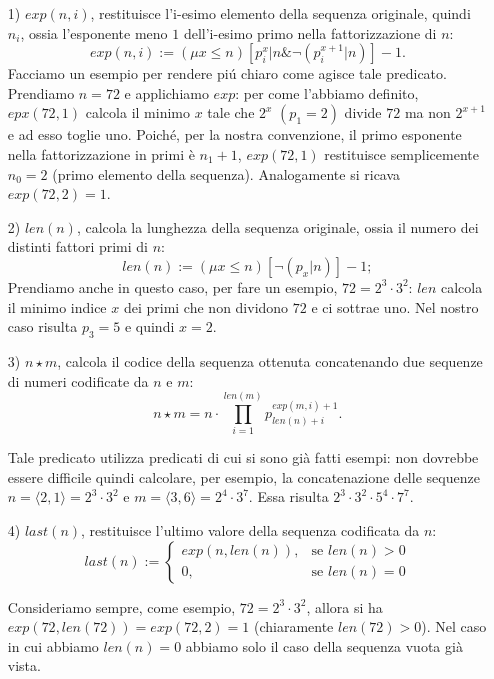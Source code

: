 \begin{itemize}
\item[1)] {$exp(n,i)$, restituisce l'i-esimo elemento della sequenza originale, quindi $n_i$, ossia l'esponente meno $1$ dell'i-esimo primo nella fat\-to\-riz\-za\-zio\-ne di $n$: $$exp(n,i) := (\mu x \leq n){ [p_{i}^{x}|n \& \neg (p_i^{x+1}|n)]-1.}$$
   Facciamo un esempio per rendere pi\'u chiaro come agisce tale predicato. Prendiamo $n=72$ e applichiamo $exp$:
per come l'abbiamo definito, $epx(72,1)$ calcola il minimo $x$ tale che $2^x$ $(p_1=2)$ divide $72$ ma non $2^{x+1}$ e ad esso toglie uno. Poich\'e, per la nostra convenzione, il primo esponente nella fattorizzazione in primi \`e $n_1+1$, $exp(72,1)$ restituisce semplicemente $n_0=2$ (primo elemento della sequenza). Analogamente si ricava $exp(72,2)=1$.}

\item[2)] $len(n)$, calcola la lunghezza della sequenza originale, ossia il numero dei distinti fattori primi di $n$:
    $$len(n):= (\mu x \leq n)[\neg (p_x|n)] - 1;$$
    Prendiamo anche in questo caso, per fare un esempio, $72=2^3\cdot3^2$: $len$ calcola il minimo indice $x$ dei primi che non dividono $72$ e ci sottrae uno. Nel nostro caso risulta $p_3=5$ e quindi $x=2$.

\item[3)] $n\star m$, calcola il codice della sequenza ottenuta concatenando due sequenze di numeri codificate da $n$ e $m$: $$n\star m= n\cdot \prod_{i=1}^{len(m)} p_{len(n)+i}^{exp(m,i)+1}.$$


Tale predicato utilizza predicati di cui si sono gi\`a fatti esempi: non dovrebbe essere difficile quindi calcolare, per esempio, la concatenazione delle sequenze $n=\langle 2, 1\rangle = 2^3\cdot 3^2 $ e $m=\langle 3, 6\rangle = 2^4\cdot 3^7$. Essa risulta $2^3\cdot 3^2\cdot 5^4 \cdot 7^7$.

\item[4)] $last(n)$, restituisce l'ultimo valore della sequenza codificata da $n$:
$$last(n) := \left\{
\begin{array}{ll}
exp(n,len(n)), & \textrm{se $len(n)> 0$} \\
0, & \textrm{se $len(n)= 0$}
\end{array}
\right.$$

Consideriamo sempre, come esempio, $72=2^3\cdot 3^2$, allora si ha $exp(72, len(72)) = exp(72,2) = 1$ (chiaramente $len(72)>0$).
Nel caso in cui abbiamo $len(n)=0$ abbiamo solo il caso della sequenza vuota gi\`a vista.
\end{itemize}



